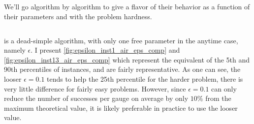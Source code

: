 We'll go algorithm by algorithm to give a flavor of their behavior as a function of their parameters and with the problem hardness. 

\subsection{\eg}

\eg is a dead-simple algorithm, with only one free parameter in the anytime case, namely $\epsilon$. I present \ref{fig:epsilon_inst1_air_eps_comp} and \ref{fig:epsilon_inst13_air_eps_comp} which represent the equivalent of the 5th and 90th percentiles of instances, and are fairly representative. As one can see, the looser $\epsilon=0.1$ tends to help the 25th percentile for the harder problem, there is very little difference for fairly easy problems. However, since $\epsilon=0.1$ can only reduce the number of successes per gauge on average by only $10\%$ from the maximum theoretical value, it is likely preferable in practice to use the looser value.


